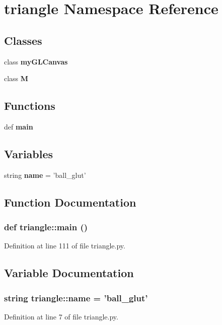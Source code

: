 \section{triangle Namespace Reference}
\label{namespacetriangle}


\subsection*{Classes}
\begin{CompactItemize}
\item 
class {\bf myGLCanvas}
\item 
class {\bf M}
\end{CompactItemize}
\subsection*{Functions}
\begin{CompactItemize}
\item 
def {\bf main}
\end{CompactItemize}
\subsection*{Variables}
\begin{CompactItemize}
\item 
string {\bf name} = 'ball\_\-glut'
\end{CompactItemize}


\subsection{Function Documentation}
\subsubsection{\setlength{\rightskip}{0pt plus 5cm}def triangle::main ()}\label{namespacetriangle_4584a7a6fbc91a43da1aeab06c3fea43}




Definition at line 111 of file triangle.py.

\subsection{Variable Documentation}
\subsubsection{\setlength{\rightskip}{0pt plus 5cm}string {\bf triangle::name} = 'ball\_\-glut'\hspace{0.3cm}{\tt  [static]}}\label{namespacetriangle_23be92dec2c52b49cb3faba2a7f8bbe2}




Definition at line 7 of file triangle.py.